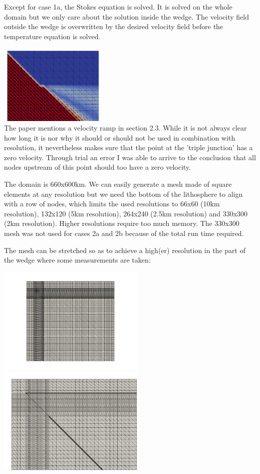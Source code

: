 Except for case 1a, the Stokes equation is solved. It is solved on the whole domain 
but we only care about the solution inside the wedge. The velocity field outside the wedge 
is overwritten by the desired velocity field before the temperature equation is solved.


\begin{center}
\includegraphics[width=5cm]{python_codes/fieldstone_68/results/case1a/vel_zoom}\\
{\captionfont The paper mentions a velocity ramp in section 2.3. While it is not 
always clear how long it is nor why it should or should not be used in combination
with resolution, it nevertheless makes sure that the point at the 'triple junction'
has a zero velocity. Through trial an error I was able to arrive to the conclusion that 
all nodes upstream of this point should too have a zero velocity.} 
\end{center}

The domain is 660x600km. We can easily generate a mesh made of square elements at any resolution 
but we need the bottom of the lithosphere to align with a row of nodes, which limits the 
used resolutions to 66x60 (10km resolution), 132x120 (5km resolution), 264x240 (2.5km resolution)
and 330x300 (2km resolution). Higher resolutions require too much memory. The 330x300 mesh was not 
used for cases 2a and 2b because of the total run time required.

The mesh can be stretched so as to achieve a high(er) resolution in the part of the wedge 
where some measurements are taken:
\begin{center}
\includegraphics[width=7cm]{python_codes/fieldstone_68/images/mesh_stretch}
\includegraphics[width=7cm]{python_codes/fieldstone_68/images/mesh_stretch_zoom}
\end{center}


